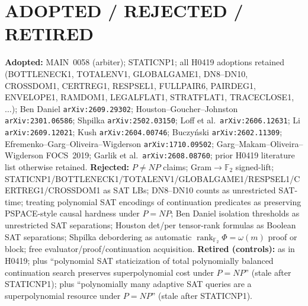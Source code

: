 \documentclass[11pt]{article}
\begin{document}
\section*{ADOPTED / REJECTED / RETIRED}
\textbf{Adopted:} MAIN~0058 (arbiter); STATICNP1; all H0419 adoptions retained
(BOTTLENECK1, TOTALENV1, GLOBALGAME1, DN8--DN10, CROSSDOM1, CERTREG1, RESPSEL1,
FULLPAIR6, PAIRDEG1, ENVELOPE1, RAMDOM1, LEGALFLAT1, STRATFLAT1, TRACECLOSE1,
$\ldots$); Ben Daniel \texttt{arXiv:2609.29302}; Houston--Goucher--Johnston
\texttt{arXiv:2301.06586}; Shpilka \texttt{arXiv:2502.03150}; Loff et al.\
\texttt{arXiv:2606.12631}; Li \texttt{arXiv:2609.12021}; Kush
\texttt{arXiv:2604.00746}; Buczy\'nski \texttt{arXiv:2602.11309}; Efremenko--Garg--Oliveira--Wigderson
\texttt{arXiv:1710.09502}; Garg--Makam--Oliveira--Wigderson FOCS~2019; Garlik et al.\
\texttt{arXiv:2608.08760}; prior H0419 literature list otherwise retained.
\textbf{Rejected:} $P\neq NP$ claims; Gram$\to\mathbb F_2$ signed-lift;
STATICNP1/BOTTLENECK1/TOTALENV1/GLOBALGAME1/RESPSEL1/CERTREG1/CROSSDOM1 as SAT LBs;
DN8--DN10 counts as unrestricted SAT-time; treating polynomial SAT encodings of
continuation predicates as preserving PSPACE-style causal hardness under $P=NP$;
Ben Daniel isolation thresholds as unrestricted SAT separations; Houston det/per
tensor-rank formulas as Boolean SAT separations; Shpilka debordering as automatic
$\operatorname{rank}_{\mathbb F_2}\Phi=\omega(m)$ proof or block; free
evaluator/proof/continuation acquisition.
\textbf{Retired (controls):} as in H0419; plus ``polynomial SAT staticization of
total polynomially balanced continuation search preserves superpolynomial cost under
$P=NP$'' (stale after STATICNP1); plus ``polynomially many adaptive SAT queries are
a superpolynomial resource under $P=NP$'' (stale after STATICNP1).
\end{document}
